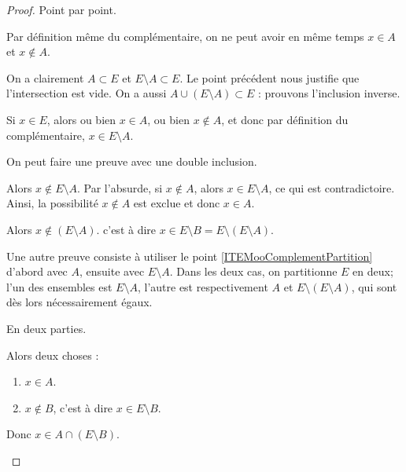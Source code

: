 \begin{proof}
	Point par point.
	\begin{subproof}
		Par définition même du complémentaire, on ne peut avoir en même temps \( x \in A \) et \(x \notin A \).

		On a clairement \( A \subset E \) et \( E \setminus A \subset E \). Le point précédent nous justifie que l'intersection est vide. On a aussi \( A \cup ( E \setminus A) \subset E \) : prouvons l'inclusion inverse.

		Si \( x \in E \), alors ou bien \( x \in A \), ou bien \( x \not\in A\), et donc par définition du complémentaire, \( x \in E \setminus A \).

		On peut faire une preuve avec une double inclusion.
		\begin{subproof}
			Alors  \( x\not\in E\setminus A \). Par l'absurde, si \( x\not\in A\), alors \( x \in E \setminus A \), ce qui est contradictoire. Ainsi, la possibilité \( x\not\in A\) est exclue et donc \( x\in A\).

			\spitem[Si \( x\in A\)]
			Alors \( x\not\in (E\setminus A) \).  c'est à dire \( x\in E\setminus B=E\setminus(E\setminus A )\).
		\end{subproof}

		Une autre preuve consiste à utiliser le point \ref{ITEMooComplementPartition} d'abord avec \( A \), ensuite avec \( E \setminus A\). Dans les deux cas, on partitionne \( E \) en deux; l'un des ensembles est \( E \setminus A \), l'autre est respectivement \( A \) et \( E \setminus (E \setminus A) \), qui sont dès lors nécessairement égaux.

		En deux parties.
		\begin{subproof}
			\spitem[Si \( x\in A\setminus B\)]
			Alors deux choses :
			\begin{enumerate}
				\item
				      \( x\in A\).
				\item
				      \( x\not\in B\), c'est à dire \( x\in E\setminus B\).
			\end{enumerate}
			Donc \( x\in A\cap(E\setminus B)\).


\end{subproof}
\end{subproof}
\end{proof}
